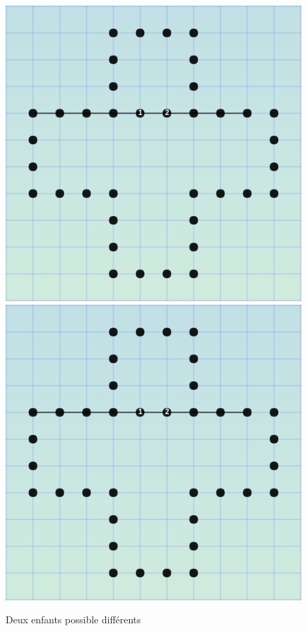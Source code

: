 \documentclass[11pt]{article}
\begin{document}
\begin{figure}[htp]
\centering
\includegraphics[scale=1.00]{position2_1.png}
\includegraphics[scale=1.00]{position2_1.png}
\caption{Deux enfants possible différents}
\label{}
\end{figure}
\end{document}
